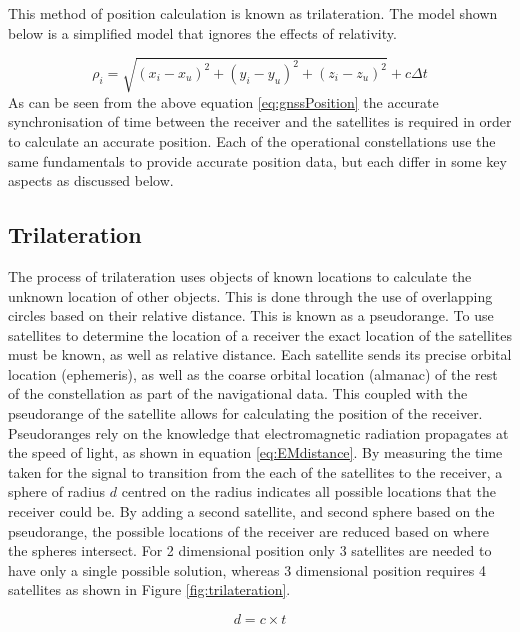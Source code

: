 This method of position calculation is known as trilateration. The model shown below is a simplified model that ignores the effects of relativity. 

\begin{equation} \label{eq:gnssPosition} 
    \rho_i = \sqrt{(x_i - x_u)^2 + (y_i - y_u)^2 + (z_i - z_u)^2} + c \Delta t
\end{equation}
As can be seen from the above equation \ref{eq:gnssPosition} the accurate synchronisation of time between the receiver and the satellites is required in order to
calculate an accurate position. 
Each of the operational constellations use the same fundamentals to provide accurate position data, but each differ in some key aspects as discussed below.

\subsection{Trilateration} \label{subsec:Trilateration}
The process of trilateration uses objects of known locations to calculate the unknown location of other objects. This is done through the use of overlapping circles based
on their relative distance. This is known as a pseudorange. To use satellites to determine the location of a receiver the exact location of the satellites must be
known, as well as relative distance. Each satellite sends its precise orbital location (ephemeris), as well as the coarse orbital location (almanac) of the rest of the
constellation as part of the navigational data. This coupled with the pseudorange of the satellite allows for calculating the position of the receiver. Pseudoranges rely
on the knowledge that electromagnetic radiation propagates at the speed of light, as shown in equation \ref{eq:EMdistance}. By measuring the time taken for the signal to
transition from the each of the satellites to the receiver, a sphere of radius $d$ centred on the radius indicates all possible locations that the receiver could be. By
adding a second satellite, and second sphere based on the pseudorange, the possible locations of the receiver are reduced based on where the spheres intersect. For 2 dimensional
position only 3 satellites are needed to have only a single possible solution, whereas 3 dimensional position requires 4 satellites as shown in Figure
\ref{fig:trilateration}.

\begin{equation} \label{eq:EMdistance}
    d = c \times t
\end{equation}

